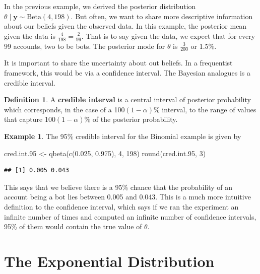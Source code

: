 \documentclass[
]{book}
\newenvironment{Shaded}{\begin{snugshade}}{\end{snugshade}}
\newcommand{\DecValTok}[1]{\textcolor[rgb]{0.00,0.00,0.81}{#1}}
\newcommand{\FloatTok}[1]{\textcolor[rgb]{0.00,0.00,0.81}{#1}}
\newcommand{\FunctionTok}[1]{\textcolor[rgb]{0.00,0.00,0.00}{#1}}
\newcommand{\NormalTok}[1]{#1}
\newcommand{\OtherTok}[1]{\textcolor[rgb]{0.56,0.35,0.01}{#1}}
\theoremstyle{definition}
\newtheorem{definition}{Definition}[chapter]
\theoremstyle{definition}
\newtheorem{example}{Example}[chapter]
\theoremstyle{definition}
\theoremstyle{definition}
\theoremstyle{remark}
\begin{document}
In the previous example, we derived the posterior distribution \(\theta \mid \boldsymbol{y} \sim \textrm{Beta}(4, 198)\). But often, we want to share more descriptive information about our beliefs given the observed data. In this example, the posterior mean given the data is \(\frac{4}{198} = \frac{2}{99}\). That is to say given the data, we expect that for every 99 accounts, two to be bots. The posterior mode for \(\theta\) is \(\frac{3}{200}\) or 1.5\%.

It is important to share the uncertainty about out beliefs. In a frequentist framework, this would be via a confidence interval. The Bayesian analogues is a credible interval.

\begin{definition}
A \textbf{credible interval} is a central interval of posterior probability which corresponds, in the case of a 100\((1-\alpha)\)\% interval, to the range of values that capture 100\((1-\alpha)\)\% of the posterior probability.
\end{definition}

\begin{example}
The 95\% credible interval for the Binomial example is given by

\begin{Shaded}
\begin{Highlighting}[]
\NormalTok{cred.int}\FloatTok{.95} \OtherTok{\textless{}{-}} \FunctionTok{qbeta}\NormalTok{(}\FunctionTok{c}\NormalTok{(}\FloatTok{0.025}\NormalTok{, }\FloatTok{0.975}\NormalTok{), }\DecValTok{4}\NormalTok{, }\DecValTok{198}\NormalTok{)}
\FunctionTok{round}\NormalTok{(cred.int}\FloatTok{.95}\NormalTok{, }\DecValTok{3}\NormalTok{)}
\end{Highlighting}
\end{Shaded}

\begin{verbatim}
## [1] 0.005 0.043
\end{verbatim}

This says that we believe there is a 95\% chance that the probability of an account being a bot lies between 0.005 and 0.043. This is a much more intuitive definition to the confidence interval, which says if we ran the experiment an infinite number of times and computed an infinite number of confidence intervals, 95\% of them would contain the true value of \(\theta\).
\end{example}

\hypertarget{the-exponential-distribution}{%
\section{The Exponential Distribution}\label{the-exponential-distribution}}
\end{document}
